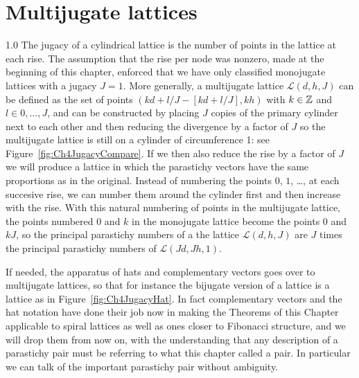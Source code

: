  \section{Multijugate lattices}
{1.0}
 The jugacy of a cylindrical lattice is the number of points in the lattice at each rise. The assumption that the rise per node was nonzero, made at the beginning of this chapter, enforced that we have only classified monojugate lattices with a jugacy $J=1$. More generally, a multijugate lattice $\mathcal{L}(d,h,J)$ can be defined as the set of points 
 $ (kd+ l/J - [kd+ l/J],kh)$ with $ k\in\mathbb{Z}$ and $l\in  0,\ldots,J$,
 and can be constructed by placing $J$ copies of the primary cylinder next to each other and then reducing the divergence by a factor of $J$ so the multijugate lattice is still on a cylinder of circumference 1: see Figure~\ref{fig:Ch4JugacyCompare}. If we then also reduce the rise by a factor of $J$ we will produce a lattice in which the parastichy vectors have the same proportions  as in the original. Instead of numbering the points $0$, $1$, \ldots, at each succesive rise, we can number them around the cylinder first and then increase with the rise. 
 With this natural numbering of points in the multijugate lattice, the points numbered $0$ and $k$ in the monojugate lattice become the points $0$ and $kJ$, so the principal parastichy numbers of a the lattice $\mathcal{L}(d,h,J)$ are $J$ times the principal parastichy numbers of $\mathcal{L}(Jd,Jh,1)$. 
 
 If needed, the apparatus of hats and complementary vectors goes over to multijugate lattices, so that for instance the bijugate version of a  lattice is a  lattice as in Figure~\ref{fig:Ch4JugacyHat}. 
 In fact complementary vectors and the hat notation have done their job now in making the Theorems of this Chapter  applicable to spiral lattices as well as ones closer to Fibonacci structure, and we will drop them from now on, with the understanding that any description of a  parastichy pair must be referring to what this chapter called a  pair. In particular we can talk of the important  parastichy pair without ambiguity. 
\clearpage

